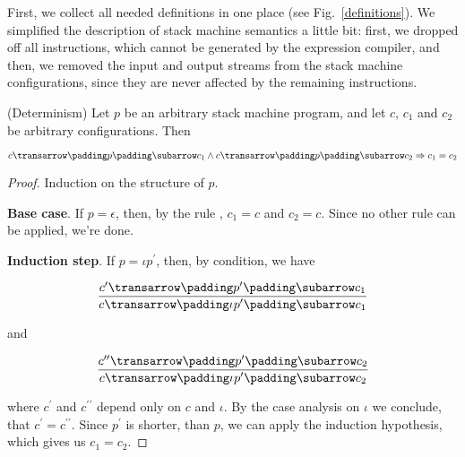 First, we collect all needed definitions in one place (see Fig.~\ref{definitions}). We simplified the description of stack machine semantics a little bit: first,
we dropped off all instructions, which cannot be generated by the expression compiler, and then, we removed the input and output streams from the stack machine
configurations, since they are never affected by the remaining instructions.

\begin{lemma}(Determinism)
  Let $p$ be an arbitrary stack machine program, and let $c$, $c_1$ and $c_2$ be arbitrary configurations. Then

  \[
    \trans{c}{p}{c_1} \wedge \trans{c}{p}{c_2} \Rightarrow c_1= c_2
  \]
\end{lemma}
\begin{proof}
  Induction on the structure of $p$.

  \textbf{Base case}. If $p=\epsilon$, then, by the rule , $c_1=c$ and $c_2=c$. Since no other rule can be
  applied, we're done.

  \textbf{Induction step}. If $p=\iota p^\prime$, then, by condition, we have

    \[
      \trule{\trans{c^\prime}{p^\prime}{c_1}}{\trans{c}{\iota p^\prime}{c_1}}
    \]

    and

    \[
      \trule{\trans{c^{\prime\prime}}{p^\prime}{c_2}}{\trans{c}{\iota p^\prime}{c_2}}
    \]

    where $c^\prime$ and $c^{\prime\prime}$ depend only on $c$ and $\iota$. By the case analysis on $\iota$ we conclude, that
    $c^\prime=c^{\prime\prime}$. Since $p^\prime$ is shorter, than $p$, we can apply the induction hypothesis, which gives us
    $c_1=c_2$.
\end{proof}

\FloatBarrier

